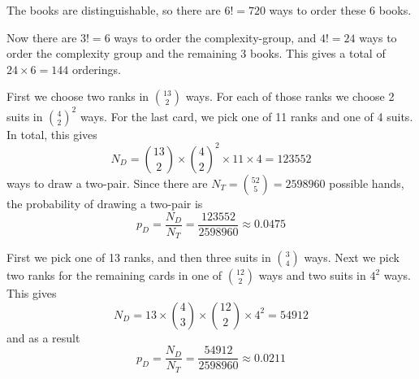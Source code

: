 \documentclass[a4paper,10pt,landscape,twocolumn]{scrartcl}
\begin{document}
\begin{exercise}[Books]
	\begin{subex}
	The books are distinguishable, so there are $6! = 720$ ways to order these $6$ books.
	\end{subex}
	
	\begin{subex}
    Now there are $3!=6$ ways to order the complexity-group, and $4!=24$ ways to order the complexity group and the remaining 3 books. This gives a total of $24\times 6 = 144$ orderings.
	\end{subex}
\end{exercise}

\begin{exercise}
	\begin{subex}
		First we choose two ranks in ${13 \choose 2}$ ways. For each of those ranks we choose 2 suits in ${4 \choose 2}^2$ ways. For the last card, we pick one of 11 ranks and one of 4 suits. In total, this gives
    	 \[  
            N_D = { 13 \choose 2} \times {4 \choose 2}^2 \times 11 \times 4 = 123 552
      	 \]
      	 ways to draw a two-pair.
      	 Since there are $N_T = {52 \choose 5} = 2598960$ possible hands, the probability of drawing a two-pair is 
      	 \[
      	   p_D = \frac{N_D}{N_T} = \frac{123552}{2598960} \approx 0.0475
    	 \]
	\end{subex}
	
	\begin{subex}
		 First we pick one of 13 ranks, and then three suits in ${3 \choose 4}$ ways. Next we pick two ranks for the remaining cards in one of ${12 \choose 2}$ ways and two suits in $4^2$ ways.
		 This gives 
		 \[
		  N_D = 13 \times {4 \choose 3} \times {12 \choose 2} \times 4^2 = 54912
		 \]
		 and as a result
		 \[
		  p_D = \frac{N_D}{N_T} = \frac{54912}{2598960} \approx 0.0211
		 \]
	\end{subex}
\end{exercise}

\vfill
{}
\end{document}
